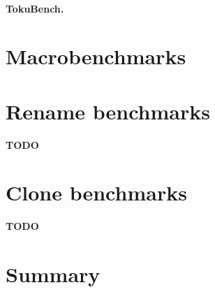 \paragraph{TokuBench.}

\section{Macrobenchmarks}

\section{Rename benchmarks}

\textbf{TODO}

\section{Clone benchmarks}

\textbf{TODO}

\section{Summary}
